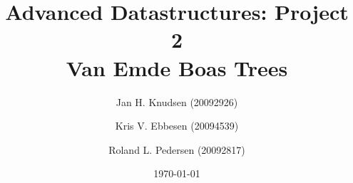 \documentclass[a4paper, 12pt]{article}
\title{Advanced Datastructures: Project 2\\
Van Emde Boas Trees}
\date{\today}
\author{Jan H. Knudsen (20092926)
\and
Kris V. Ebbesen (20094539)
\and
Roland L. Pedersen (20092817)
}
\begin{document}
\maketitle
\newpage
\tableofcontents
\newpage













\begin{thebibliography}{9}

\end{thebibliography}
\end{document}
